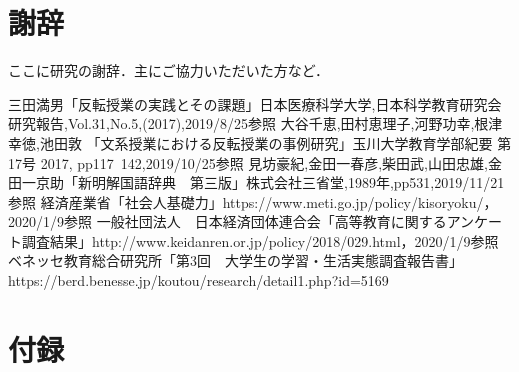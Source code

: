 \documentclass[a4j,11pt]{jsarticle}
\begin{document}
\newpage

\section*{謝辞}
ここに研究の謝辞．主にご協力いただいた方など．
\newpage


\begin{thebibliography}{3}
三田満男「反転授業の実践とその課題」日本医療科学大学,日本科学教育研究会研究報告,Vol.31,No.5,(2017),2019/8/25参照
大谷千恵,田村恵理子,河野功幸,根津幸徳,池田敦 「文系授業における反転授業の事例研究」玉川大学教育学部紀要 第17号 2017, pp117~142,2019/10/25参照
見坊豪紀,金田一春彦,柴田武,山田忠雄,金田一京助「新明解国語辞典　第三版」株式会社三省堂,1989年,pp531,2019/11/21参照
経済産業省「社会人基礎力」https://www.meti.go.jp/policy/kisoryoku/，2020/1/9参照
一般社団法人　日本経済団体連合会「高等教育に関するアンケート調査結果」http://www.keidanren.or.jp/policy/2018/029.html，2020/1/9参照
ベネッセ教育総合研究所「第3回　大学生の学習・生活実態調査報告書」https://berd.benesse.jp/koutou/research/detail1.php?id=5169
\end{thebibliography}

\section*{付録}
\end{document}
